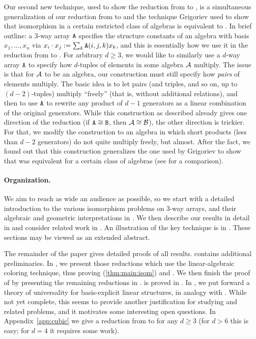 Our second new technique, used to show the reduction from \DeeTI to \ThreeTI, is a 
simultaneous generalization of our reduction from \ThreeTI to \AlgIsolong and the 
technique Grigoriev used \cite{Grigoriev83} to show that isomorphism in a certain 
restricted class of algebras is equivalent to \GI. In brief 
outline: a 3-way 
array $\mathtt{A}$ specifies the structure constants of an algebra with basis $x_1, 
\dotsc, x_n$ via $x_i \cdot x_j := \sum_{k} \mathtt{A}(i,j,k) x_k$, and this is 
essentially how we use it in the reduction from \ThreeTI to \AlgIsolong. For 
arbitrary $d \geq 3$, we would like to similarly use a $d$-way array $\mathtt{A}$ to 
specify how $d$-tuples of elements in some algebra $\mathcal{A}$ multiply. The issue is 
that for $\mathcal{A}$ to be an algebra, our construction must still specify how 
\emph{pairs} of elements multiply. The basic idea is to let pairs (and triples, 
and so on, up to $(d-2)$-tuples) multiply ``freely'' (that is, without additional 
relations), and then to use $\mathtt{A}$ to rewrite any product of $d-1$ generators as a 
linear combination of the original generators. While this construction as 
described already gives one direction of the reduction (if $\mathtt{A} \cong \mathtt{B}$, then 
$\mathcal{A} \cong \mathcal{B}$), the other direction is trickier. For that, we modify the 
construction to an algebra in which short products (less than $d-2$ generators) do 
not quite multiply freely, but almost. After the fact, we found out that this 
construction generalizes the one used by Grigoriev \cite{Grigoriev83} to show that 
\GI was equivalent \AlgIsolong for a certain class of algebras (see 
 for a comparison).

\paragraph{Organization.} We aim to reach as wide an audience as 
possible, so we start with a detailed introduction to the 
various isomorphism problems on 
3-way arrays, and their algebraic and geometric 
interpretations in . We then describe our results in 
detail in  and consider related work in . An illustration of the key technique is in 
. These sections may be viewed as 
an extended abstract. 

The remainder of the paper gives detailed proofs of all results.  contains additional
preliminaries. In , we present those 
reductions which use the linear-algebraic coloring technique, thus proving
(\ref{thm:main:isom}) and 
. We then finish the proof of 
by presenting the remaining reductions in . 
 is proved in .
In , we put forward a theory of 
universality for basis-explicit linear structures, in analogy with \cite{ZKT}. 
While not yet complete, this seems to provide another justification for studying 
\TIlong and related problems, and it motivates some interesting open 
questions. In Appendix~\ref{app:cubic} we give a reduction from \CubicFormlong to \DFormlong for any $d \geq 3$ (for $d > 6$ this is easy; for $d=4$ it requires some work).

